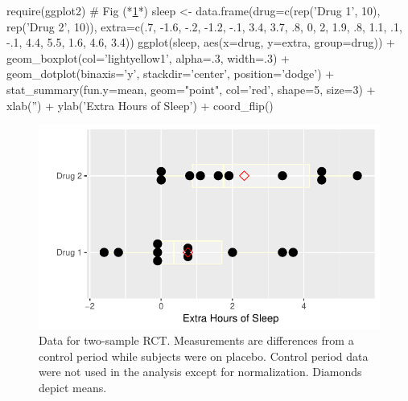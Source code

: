 \begin{Schunk}
\begin{Sinput}
require(ggplot2)   # Fig (*\ref{fig:htest-sleepa}*)
sleep <- data.frame(drug=c(rep('Drug 1', 10), rep('Drug 2', 10)),
                    extra=c(.7, -1.6, -.2, -1.2, -.1, 3.4, 3.7, .8, 0, 2,
                      1.9, .8, 1.1, .1, -.1, 4.4, 5.5, 1.6, 4.6, 3.4))
ggplot(sleep, aes(x=drug, y=extra, group=drug)) +
  geom_boxplot(col='lightyellow1', alpha=.3, width=.3) + 
  geom_dotplot(binaxis='y', stackdir='center', position='dodge') +
  stat_summary(fun.y=mean, geom="point", col='red', shape=5, size=3) +
  xlab('') + ylab('Extra Hours of Sleep') + coord_flip() 
\end{Sinput}
\begin{figure}[htbp]

\centerline{\includegraphics[width=\maxwidth]{htest-sleepa-1} }

\caption[Two-sample parallel group RCT]{Data for two-sample RCT.  Measurements are differences from a control period while subjects were on placebo.  Control period data were not used in the analysis except for normalization.  Diamonds depict means.}\label{fig:htest-sleepa}
\end{figure}
\end{Schunk}

